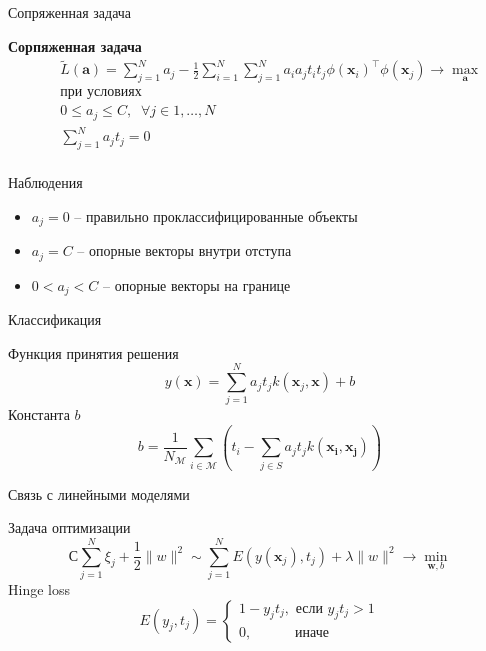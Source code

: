 \documentclass[10pt,a4paper]{beamer}
\begin{document}
\begin{frame}{Сопряженная задача}

\begin{framed}
{\bf Сорпяженная задача}
\begin{eqnarray*}
&& \tilde{L}(\mathbf{a}) = \sum_{j=1}^N a_j - \frac{1}{2} \sum_{i=1}^N \sum_{j=1}^N a_i a_j t_i t_j \phi(\mathbf{x}_i)^\top \phi(\mathbf{x}_j) \rightarrow \max_{\mathbf{a}} \\
&& \text{при условиях} \\
&& 0 \leq a_j \leq C, \;\; \forall j \in 1,\ldots,N \\
&& \sum_{j=1}^N a_j t_j = 0\\
\end{eqnarray*}
\end{framed}

Наблюдения
\begin{itemize}
\item $a_j = 0$ -- правильно проклассифицированные объекты
\item $a_j = C$ -- опорные векторы внутри отступа 
\item $0 < a_j < C$ -- опорные векторы на границе
\end{itemize}

\end{frame}


\begin{frame}{Классификация}

Функция принятия решения
\[
y(\mathbf{x}) = \sum_{j=1}^N a_j t_j k(\mathbf{x}_j, \mathbf{x}) + b
\]
Константа $b$
\[
b = \frac{1}{N_\mathcal{M}} \sum_{i \in \mathcal{M}} \left( t_i - \sum_{j \in S} a_j t_j k(\mathbf{x_i}, \mathbf{x_j})\right)
\]

\end{frame}


\begin{frame}{Связь с линейными моделями}

Задача оптимизации 
\[
С \sum_{j=1}^N \xi_j + \frac{1}{2} \|w\|^2 \sim \sum_{j=1}^N E(y(\mathbf{x}_j), t_j) + \lambda \|w\|^2 \rightarrow \min_{\mathbf{w}, b}
\]
Hinge loss
\[
E(y_j, t_j) = \begin{cases}
1 - y_j t_j, \text{ если } y_j t_j > 1 \\
0, \quad\quad\;\;\,\text{ иначе }
\end{cases}
\]

\end{frame}
\end{document}
